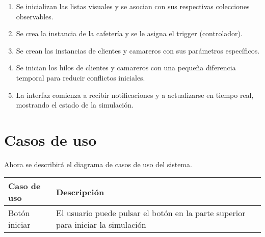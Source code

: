 \documentclass[a4paper,12pt]{article}
\begin{document}
\begin{enumerate}
    \item Se inicializan las listas visuales y se asocian con sus respectivas colecciones observables.
    \item Se crea la instancia de la cafetería y se le asigna el trigger (controlador).
    \item Se crean las instancias de clientes y camareros con sus parámetros específicos.
    \item Se inician los hilos de clientes y camareros con una pequeña diferencia temporal para reducir conflictos iniciales.
    \item La interfaz comienza a recibir notificaciones y a actualizarse en tiempo real, mostrando el estado de la simulación.
\end{enumerate}

\section{Casos de uso}
Ahora se describirá el diagrama de casos de uso del sistema.
\begin{center}
\begin{tabular}{ | m{10em} | m{20em}|} 
  \hline
  \textbf{Caso de uso} & \textbf{Descripción}\\
  \hline
  Botón iniciar & El usuario puede pulsar el botón en la parte superior para iniciar la simulación\\
  \hline
\end{tabular}
\end{center}
\end{document}
